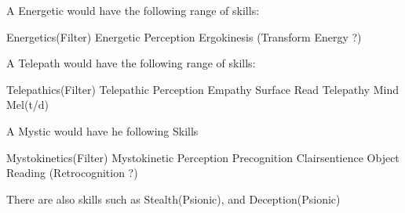 A Energetic would have the following range of skills:

Energetics(Filter)
Energetic Perception
Ergokinesis (Transform Energy ?)

A Telepath would have the following range of skills:

Telepathics(Filter)
Telepathic Perception
Empathy
Surface Read
Telepathy 
Mind Mel(t/d)

A Mystic would have he following Skills

Mystokinetics(Filter)
Mystokinetic Perception
Precognition
Clairsentience
Object Reading (Retrocognition ?)

There are also skills such as Stealth(Psionic), and Deception(Psionic)









